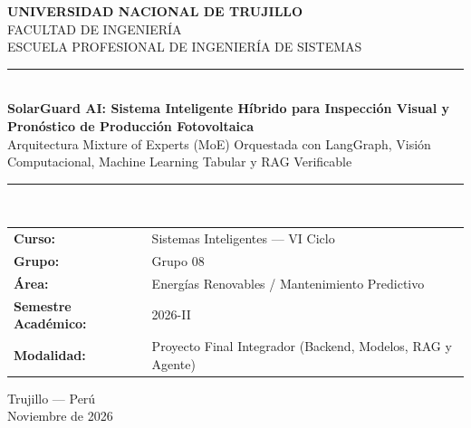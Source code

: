 \documentclass[12pt,a4paper]{article}
\begin{document}
\begin{titlepage}
    \centering
    \vspace*{1cm}
    {\Large \textbf{UNIVERSIDAD NACIONAL DE TRUJILLO}}\\[0.3cm]
    {\large FACULTAD DE INGENIERÍA}\\
    {\large ESCUELA PROFESIONAL DE INGENIERÍA DE SISTEMAS}\\[1.8cm]

    {\color{untblue}\rule{\linewidth}{1.5pt}}\\[0.5cm]
    {\LARGE \textbf{SolarGuard AI: Sistema Inteligente Híbrido para Inspección Visual y Pronóstico de Producción Fotovoltaica}}\\[0.3cm]
    {\large Arquitectura Mixture of Experts (MoE) Orquestada con LangGraph, Visión Computacional, Machine Learning Tabular y RAG Verificable}\\[0.2cm]
    {\color{untblue}\rule{\linewidth}{1.5pt}}\\[1.5cm]

    \begin{tabular}{ll}
        \textbf{Curso:} & Sistemas Inteligentes — VI Ciclo \\
        \textbf{Grupo:} & Grupo 08 \\
        \textbf{Área:} & Energías Renovables / Mantenimiento Predictivo \\
        \textbf{Semestre Académico:} & 2026-II \\
        \textbf{Modalidad:} & Proyecto Final Integrador (Backend, Modelos, RAG y Agente) \\
    \end{tabular}

    \vfill
    {\large Trujillo — Perú}\\
    {\large Noviembre de 2026}
\end{titlepage}
\end{document}
